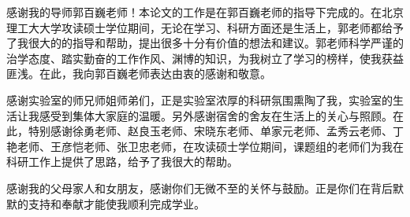 

\begin{thanks}


感谢我的导师郭百巍老师！本论文的工作是在郭百巍老师的指导下完成的。在北京理工大大学攻读硕士学位期间，无论在学习、科研方面还是生活上，郭老师都给予了我很大的的指导和帮助，提出很多十分有价值的想法和建议。郭老师科学严谨的治学态度、踏实勤奋的工作作风、渊博的知识，为我树立了学习的榜样，使我获益匪浅。在此，我向郭百巍老师表达由衷的感谢和敬意。

感谢实验室的师兄师姐师弟们，正是实验室浓厚的科研氛围熏陶了我，实验室的生活让我感受到集体大家庭的温暖。另外感谢宿舍的舍友在生活上的关心与照顾。在此，特别感谢徐勇老师、赵良玉老师、宋晓东老师、单家元老师、孟秀云老师、丁艳老师、王彦恺老师、张卫忠老师，在攻读硕士学位期间，课题组的老师们为我在科研工作上提供了思路，给予了我很大的帮助。

感谢我的父母家人和女朋友，感谢你们无微不至的关怀与鼓励。正是你们在背后默默的支持和奉献才能使我顺利完成学业。


\end{thanks}
